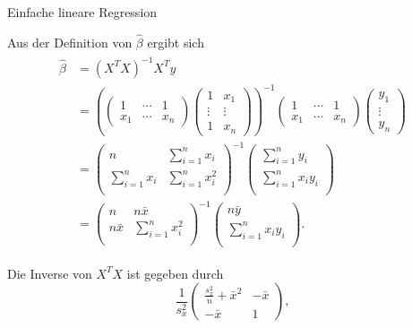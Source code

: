 \documentclass[
  8pt,
  ignorenonframetext,
]{beamer}
\begin{document}
\begin{frame}{Einfache lineare Regression}
\protect\hypertarget{einfache-lineare-regression-3}{}
\footnotesize

Aus der Definition von \(\hat{\beta}\) ergibt sich \begin{align}
\begin{split}
\hat{\beta}
& = (X^T X)^{-1}X^Ty \\
& =
\left(
\begin{pmatrix}
1   & \cdots & 1 \\
x_1 & \cdots & x_n
\end{pmatrix}
\begin{pmatrix}
1       & x_1       \\
\vdots  & \vdots    \\
1       & x_n
\end{pmatrix}
\right)^{-1}
\begin{pmatrix}
1   & \cdots & 1 \\
x_1 & \cdots & x_n
\end{pmatrix}
\begin{pmatrix}
y_1     \\
\vdots  \\
y_n
\end{pmatrix} \\
& =
\begin{pmatrix}
n                   & \sum_{i=1}^n x_i \\
\sum_{i=1}^n x_i    & \sum_{i=1}^n x_i^2\\
\end{pmatrix}^{-1}
\begin{pmatrix}
\sum_{i=1}^n y_i    \\
\sum_{i=1}^n x_i y_i    \\
\end{pmatrix}
\\
& =
\begin{pmatrix}
n           &  n\bar{x} \\
n\bar{x}    & \sum_{i=1}^n x_i^2\\
\end{pmatrix}^{-1}
\begin{pmatrix}
n\bar{y}    \\
\sum_{i=1}^n x_i y_i    \\
\end{pmatrix}.
\end{split}
\end{align}

Die Inverse von \(X^T X\) ist gegeben durch \begin{equation}
\frac{1}{s_x^2}
\begin{pmatrix}
  \frac{s_x^2}{n} + \bar{x}^2
& -\bar{x}
\\
  -\bar{x}
&  1
\end{pmatrix},
\end{equation}
\end{frame}
\end{document}
